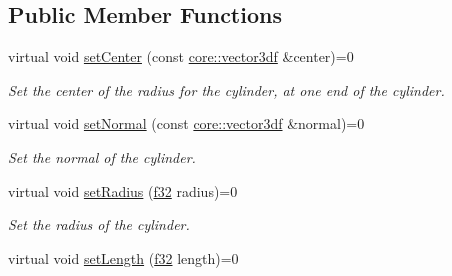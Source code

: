 \subsection*{Public Member Functions}
\begin{DoxyCompactItemize}
\item 
\mbox{\label{classirr_1_1scene_1_1IParticleCylinderEmitter_a93e13715b485cc732e11d1e551b6fd97}} 
virtual void \hyperlink{classirr_1_1scene_1_1IParticleCylinderEmitter_a93e13715b485cc732e11d1e551b6fd97}{set\+Center} (const \hyperlink{namespaceirr_1_1core_ae6e2b2a6c552833ebbd5b7463d03586b}{core\+::vector3df} \&center)=0
\begin{DoxyCompactList}\small\item\em Set the center of the radius for the cylinder, at one end of the cylinder. \end{DoxyCompactList}\item 
\mbox{\label{classirr_1_1scene_1_1IParticleCylinderEmitter_a15fdc31ab77f659ee7d10b3c6bec7bb6}} 
virtual void \hyperlink{classirr_1_1scene_1_1IParticleCylinderEmitter_a15fdc31ab77f659ee7d10b3c6bec7bb6}{set\+Normal} (const \hyperlink{namespaceirr_1_1core_ae6e2b2a6c552833ebbd5b7463d03586b}{core\+::vector3df} \&normal)=0
\begin{DoxyCompactList}\small\item\em Set the normal of the cylinder. \end{DoxyCompactList}\item 
\mbox{\label{classirr_1_1scene_1_1IParticleCylinderEmitter_a5961ae932128327520e3c961edd943be}} 
virtual void \hyperlink{classirr_1_1scene_1_1IParticleCylinderEmitter_a5961ae932128327520e3c961edd943be}{set\+Radius} (\hyperlink{namespaceirr_a0277be98d67dc26ff93b1a6a1d086b07}{f32} radius)=0
\begin{DoxyCompactList}\small\item\em Set the radius of the cylinder. \end{DoxyCompactList}\item 
\mbox{\label{classirr_1_1scene_1_1IParticleCylinderEmitter_aa074f71486084c28bd374c3714d3d9ef}} 
virtual void \hyperlink{classirr_1_1scene_1_1IParticleCylinderEmitter_aa074f71486084c28bd374c3714d3d9ef}{set\+Length} (\hyperlink{namespaceirr_a0277be98d67dc26ff93b1a6a1d086b07}{f32} length)=0

\end{DoxyCompactItemize}
